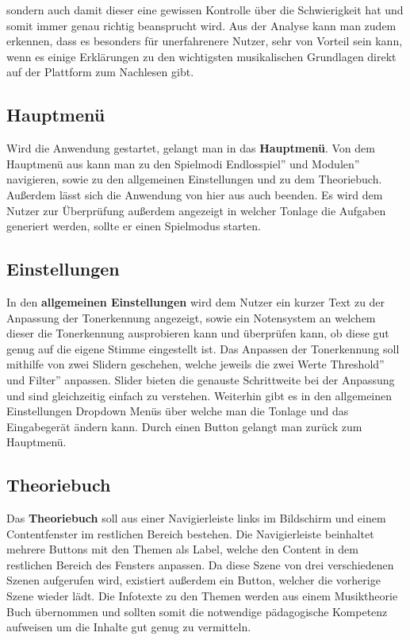 sondern auch damit dieser eine gewissen Kontrolle über die Schwierigkeit hat und somit immer genau richtig beansprucht wird. Aus der Analyse kann man zudem erkennen, dass es besonders für unerfahrenere Nutzer, sehr von Vorteil sein kann, wenn es einige Erklärungen zu den wichtigsten musikalischen Grundlagen direkt auf der Plattform zum Nachlesen gibt. 

\subsection{Hauptmenü}
Wird die Anwendung gestartet, gelangt man in das \textbf{Hauptmenü}. Von dem Hauptmenü aus kann man zu den Spielmodi \glqq Endlosspiel'' und \glqq Modulen'' navigieren, sowie zu den allgemeinen Einstellungen und zu dem Theoriebuch. Außerdem lässt sich die Anwendung von hier aus auch beenden. Es wird dem Nutzer zur Überprüfung außerdem angezeigt in welcher Tonlage die Aufgaben generiert werden, sollte er einen Spielmodus starten.

\subsection{Einstellungen}
In den \textbf{allgemeinen Einstellungen} wird dem Nutzer ein kurzer Text zu der Anpassung der Tonerkennung angezeigt, sowie ein Notensystem an welchem dieser die Tonerkennung ausprobieren kann und überprüfen kann, ob diese gut genug auf die eigene Stimme eingestellt ist. Das Anpassen der Tonerkennung soll mithilfe von zwei Slidern geschehen, welche jeweils die zwei Werte \glqq Threshold'' und \glqq Filter'' anpassen. Slider bieten die genauste Schrittweite bei der Anpassung und sind gleichzeitig einfach zu verstehen. Weiterhin gibt es in den allgemeinen Einstellungen Dropdown Menüs über welche man die Tonlage und das Eingabegerät ändern kann. Durch einen Button gelangt man zurück zum Hauptmenü.

\subsection{Theoriebuch}
Das \textbf{Theoriebuch} soll aus einer Navigierleiste links im Bildschirm und einem Contentfenster im restlichen Bereich bestehen. Die Navigierleiste beinhaltet mehrere Buttons mit den Themen als Label, welche den Content in dem restlichen Bereich des Fensters anpassen. Da diese Szene von drei verschiedenen Szenen aufgerufen wird, existiert außerdem ein Button, welcher die vorherige Szene wieder lädt. Die Infotexte zu den Themen werden aus einem Musiktheorie Buch übernommen und sollten somit die notwendige pädagogische Kompetenz aufweisen um die Inhalte gut genug zu vermitteln. \cite{abcmusik} 

